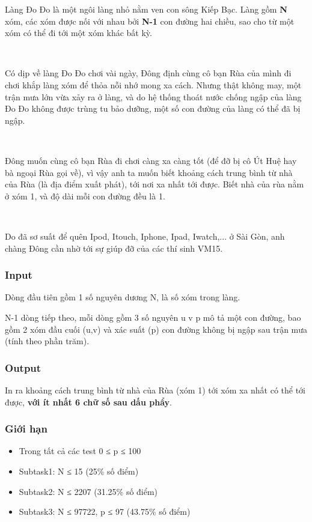 

Làng Đo Đo là một ngôi làng nhỏ nằm ven con sông Kiếp Bạc. Làng gồm\textbf{ N} xóm, các xóm được nối với nhau bởi\textbf{ N-1} con đường hai chiều, sao cho từ một xóm có thể đi tới một xóm khác bất kỳ.

 

Có dịp về làng Đo Đo chơi vài ngày, Đông định cùng cô bạn Rùa của mình đi chơi khắp làng xóm để thỏa nỗi nhớ mong xa cách. Nhưng thật không may, một trận mưa lớn vừa xảy ra ở làng, và do hệ thống thoát nước chống ngập của làng Đo Đo không được trùng tu bảo dưỡng, một số con đường của làng có thể đã bị ngập.

 

Đông muốn cùng cô bạn Rùa đi chơi càng xa càng tốt (để đỡ bị cô Út Huệ hay bà ngoại Rùa gọi về), vì vậy anh ta muốn biết khoảng cách trung bình từ nhà của Rùa (là địa điểm xuất phát), tới nơi xa nhất tới được. Biết nhà của rùa nằm ở xóm 1, và độ dài mỗi con đường đều là 1.

 

Do đã sơ suất để quên Ipod, Itouch, Iphone, Ipad, Iwatch,... ở Sài Gòn, anh chàng Đông cần nhờ tới sự giúp đỡ của các thí sinh VM15.

\subsubsection{Input}

Dòng đầu tiên gồm 1 số nguyên dương N, là số xóm trong làng.

N-1 dòng tiếp theo, mỗi dòng gồm 3 số nguyên u v p mô tả một con đường, bao gồm 2 xóm đầu cuối (u,v) và xác suất (p) con đường không bị ngập sau trận mưa (tính theo phần trăm).

\subsubsection{Output}

In ra khoảng cách trung bình từ nhà của Rùa (xóm 1) tới xóm xa nhất có thể tới được, \textbf{với ít nhất 6 chữ số sau dấu phẩy}.

\subsubsection{Giới hạn}
\begin{itemize}
	\item Trong tất cả các test 0 ≤ p ≤ 100
	\item Subtask1: N ≤ 15 (25\% số điểm)
	\item Subtask2: N ≤ 2207 (31.25\% số điểm)
	\item Subtask3: N ≤ 97722, p ≤ 97 (43.75\% số điểm)
\end{itemize}

